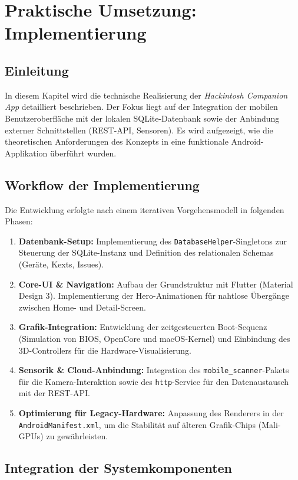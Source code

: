 \chapter{Praktische Umsetzung: Implementierung} %
\label{sec:implementierung}

\section{Einleitung}
In diesem Kapitel wird die technische Realisierung der \textit{Hackintosh Companion App} detailliert beschrieben. Der Fokus liegt auf der Integration der mobilen Benutzeroberfläche mit der lokalen SQLite-Datenbank sowie der Anbindung externer Schnittstellen (REST-API, Sensoren). Es wird aufgezeigt, wie die theoretischen Anforderungen des Konzepts in eine funktionale Android-Applikation überführt wurden.

\section{Workflow der Implementierung}
Die Entwicklung erfolgte nach einem iterativen Vorgehensmodell in folgenden Phasen:

\begin{enumerate}
    \item \textbf{Datenbank-Setup:} Implementierung des \texttt{DatabaseHelper}-Singletons zur Steuerung der SQLite-Instanz und Definition des relationalen Schemas (Geräte, Kexts, Issues).
    \item \textbf{Core-UI \& Navigation:} Aufbau der Grundstruktur mit Flutter (Material Design 3). Implementierung der Hero-Animationen für nahtlose Übergänge zwischen Home- und Detail-Screen.
    \item \textbf{Grafik-Integration:} Entwicklung der zeitgesteuerten Boot-Sequenz (Simulation von BIOS, OpenCore und macOS-Kernel) und Einbindung des 3D-Controllers für die Hardware-Visualisierung.
    \item \textbf{Sensorik \& Cloud-Anbindung:} Integration des \texttt{mobile\_scanner}-Pakets für die Kamera-Interaktion sowie des \texttt{http}-Service für den Datenaustausch mit der REST-API.
    \item \textbf{Optimierung für Legacy-Hardware:} Anpassung des Renderers in der \texttt{AndroidManifest.xml}, um die Stabilität auf älteren Grafik-Chips (Mali-GPUs) zu gewährleisten.
\end{enumerate}

\section{Integration der Systemkomponenten}

